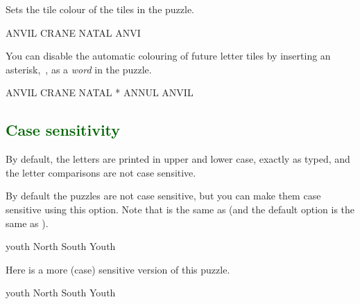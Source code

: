 \documentclass[svgnames]{report}
\newcommand\Section[1]{\subsection{\textcolor{DarkGreen}{#1}}}
\begin{document}

  Sets the tile colour of the \textit{\empty} tiles in the puzzle.

  \begin{example}
    \begin{wordle}[rows=5, empty=AliceBlue]{ANVIL}
      CRANE
      NATAL
      ANVI
    \end{wordle}
  \end{example}

  \option{*}

  You can disable the automatic colouring of future letter tiles by
  inserting an asterisk,~\option{*}, as a \textit{word} in the puzzle.

  \begin{example}
    \begin{wordle}{ANVIL}
      CRANE
      NATAL
      *
      ANNUL
      ANVIL
    \end{wordle}
  \end{example}


  \Section{Case sensitivity}

  By default, the letters are printed in upper and lower case, exactly
  as typed, and the letter comparisons are not case sensitive.


  By default the  puzzles are not case sensitive, but
  you can make them case sensitive using this option. Note that
   is the same as 
  (and the default option is the same as
  ).

  \begin{example}
    \begin{wordle}{youth}
      North
      South
      Youth
    \end{wordle}
  \end{example}

  Here is a more (case) sensitive version of this puzzle.

  \begin{example}
    \begin{wordle}[case sensitive=true]{youth}
      North
      South
      Youth
    \end{wordle}
  \end{example}
\end{document}
